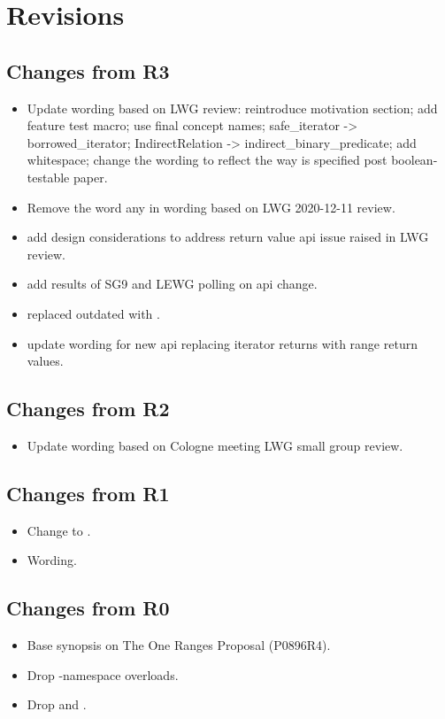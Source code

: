\section{Revisions}

\subsection{Changes from R3}

\begin{itemize}
  \item Update wording based on LWG review: reintroduce motivation section; add feature test macro; use final concept names; safe_iterator -> borrowed_iterator; IndirectRelation -> indirect_binary_predicate; add whitespace; change the wording to reflect the way  is specified post boolean-testable paper.
  \item Remove the word any in wording based on LWG 2020-12-11 review.
  \item add design considerations to address return value api issue raised in LWG review.
  \item add results of SG9 and LEWG polling on api change.
  \item replaced outdated  with .
  \item update wording for new api replacing iterator returns with range return values.
\end{itemize}

\subsection{Changes from R2}

\begin{itemize}
  \item Update wording based on Cologne meeting LWG small group review.
\end{itemize}

\subsection{Changes from R1}

\begin{itemize}
  \item Change  to .
  \item Wording.
\end{itemize}

\subsection{Changes from R0}

\begin{itemize}
  \item Base synopsis on The One Ranges Proposal (P0896R4).
  \item Drop -namespace overloads.
  \item Drop  and .
\end{itemize}
